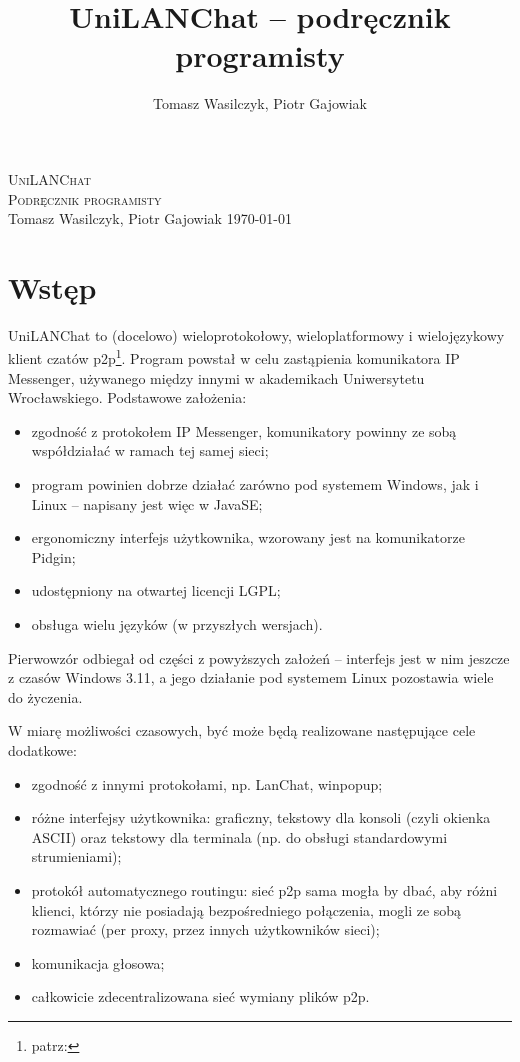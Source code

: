 \documentclass[11pt,leqno]{article}
\author{Tomasz Wasilczyk, Piotr Gajowiak}
\title{UniLANChat -- podręcznik programisty}
\begin{document}
\begin{titlepage}
\begin{center}
	\vspace*{6cm}
	\textsc{\LARGE UniLANChat}\\[0.25cm]
	\textsc{\Large Podręcznik programisty}\\[1cm]
	Tomasz Wasilczyk, Piotr Gajowiak
	\vfill
	\today
\end{center}
\end{titlepage}

\tableofcontents

\section{Wstęp}
UniLANChat to (docelowo) wieloprotokołowy, wieloplatformowy i wielojęzykowy klient
czatów p2p\footnote{patrz: }.
Program powstał w celu zastąpienia komunikatora IP Messenger, używanego między innymi w akademikach
Uniwersytetu Wrocławskiego. Podstawowe założenia:
\begin{itemize}
	\item zgodność z protokołem IP Messenger, komunikatory powinny ze sobą współdziałać w ramach tej
	samej sieci;
	\item program powinien dobrze działać zarówno pod systemem Windows, jak i Linux -- napisany jest
	więc w JavaSE;
	\item ergonomiczny interfejs użytkownika, wzorowany jest na komunikatorze Pidgin;
	\item udostępniony na otwartej licencji LGPL;
	\item obsługa wielu języków (w przyszłych wersjach).
\end{itemize}

Pierwowzór odbiegał od części z powyższych założeń -- interfejs jest w nim jeszcze z czasów
Windows 3.11, a jego działanie pod systemem Linux pozostawia wiele do życzenia.

\vspace{1cm}
W miarę możliwości czasowych, być może będą realizowane następujące cele dodatkowe:
\begin{itemize}
	\item zgodność z innymi protokołami, np. LanChat, winpopup;
	\item różne interfejsy użytkownika: graficzny, tekstowy dla konsoli (czyli okienka ASCII) oraz
	tekstowy dla terminala (np. do obsługi standardowymi strumieniami);
	\item protokół automatycznego routingu: sieć p2p sama mogła by dbać, aby różni klienci,
	którzy nie posiadają bezpośredniego połączenia, mogli ze sobą rozmawiać (per proxy, przez innych
	użytkowników sieci);
	\item komunikacja głosowa;
	\item całkowicie zdecentralizowana sieć wymiany plików p2p.
\end{itemize}
\end{document}

